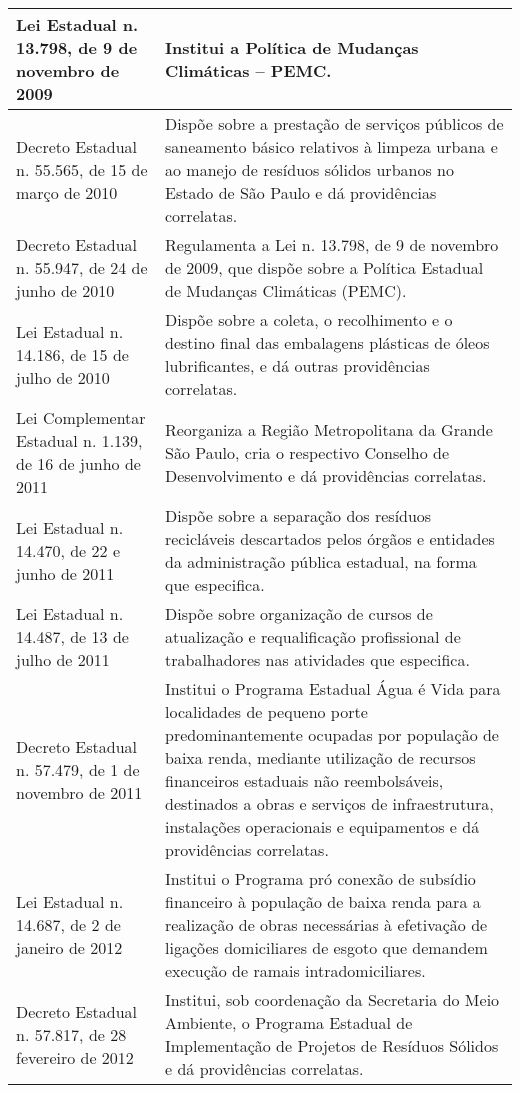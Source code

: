 \begin{center}
\begin{longtable}{|p{}|p{}|}
			\hline
			Lei Estadual n. 13.798, de 9 de novembro de 2009 & Institui a Política de Mudanças Climáticas – PEMC. \\
			\hline
			Decreto Estadual n. 55.565, de 15 de março de 2010 & Dispõe sobre a prestação de serviços públicos de saneamento básico relativos à limpeza  urbana  e  ao  manejo  de  resíduos  sólidos  urbanos  no  Estado  de  São Paulo e dá providências correlatas. \\
			\hline
			Decreto Estadual n. 55.947, de 24 de junho de 2010 & Regulamenta a Lei n. 13.798, de 9 de novembro de 2009, que dispõe sobre a Política Estadual de Mudanças Climáticas (PEMC). \\
			\hline
			Lei  Estadual  n.  14.186,  de  15 de julho de 2010 & Dispõe sobre a coleta, o recolhimento e o destino final das embalagens plásticas de óleos lubrificantes, e dá outras providências correlatas. \\
			\hline
			Lei Complementar Estadual n. 1.139, de 16 de junho de 2011 & Reorganiza  a  Região  Metropolitana  da  Grande  São  Paulo,  cria  o  respectivo Conselho de Desenvolvimento e dá providências correlatas. \\
			\hline
			Lei Estadual n. 14.470, de 22 e junho de 2011 & Dispõe sobre a separação dos resíduos recicláveis descartados pelos órgãos e entidades da administração pública estadual, na forma que especifica. \\
			\hline
			Lei  Estadual  n.  14.487,  de  13 de julho de 2011 & Dispõe sobre organização de cursos de atualização e requalificação profissional de trabalhadores nas atividades que especifica. \\
			\hline
			Decreto Estadual n. 57.479, de 1 de novembro de 2011 & Institui  o  Programa  Estadual  Água  é  Vida  para  localidades  de  pequeno  porte predominantemente   ocupadas   por   população   de   baixa   renda,   mediante utilização  de  recursos  financeiros  estaduais  não  reembolsáveis,  destinados  a obras  e  serviços  de  infraestrutura, instalações  operacionais  e  equipamentos  e dá providências correlatas. \\
			\hline
			Lei Estadual n. 14.687, de 2 de janeiro de 2012 & Institui  o  Programa  pró  conexão  de  subsídio  financeiro  à  população  de  baixa renda   para   a   realização   de   obras   necessárias   à   efetivação   de   ligações domiciliares de esgoto que demandem execução de ramais intradomiciliares. \\
			\hline
			Decreto Estadual n. 57.817, de 28 fevereiro de 2012 & Institui, sob coordenação da Secretaria do Meio Ambiente, o Programa Estadual de   Implementação   de   Projetos   de   Resíduos   Sólidos   e   dá   providências correlatas. \\

\end{longtable}
\end{center}

